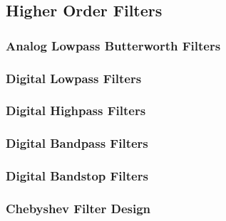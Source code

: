 \subsection{Higher Order Filters}
\subsubsection{Analog Lowpass Butterworth Filters}
\subsubsection{Digital Lowpass Filters}
\subsubsection{Digital Highpass Filters}
\subsubsection{Digital Bandpass Filters}
\subsubsection{Digital Bandstop Filters}
\subsubsection{Chebyshev Filter Design}
